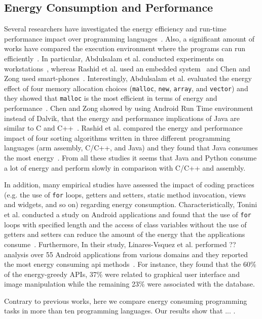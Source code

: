 \subsection{Energy Consumption and Performance}
Several researchers have investigated the energy efficiency
and run-time performance impact over
programming languages~\cite{}.
Also, a significant amount of works have compared the execution
environment where the programs can run efficiently~\cite{}.
In particular, Abdulsalam et al. conducted experiments on workstations~\cite{},
whereas Rashid et al. used an embedded system~\cite{} and
Chen and Zong used smart-phones~\cite{}.
Interestingly, Abdulsalam et al. evaluated the energy effect of four memory
allocation choices ({\tt malloc}, {\tt new}, {\tt array}, and {\tt vector})
and they showed that {\tt malloc} is the most efficient
in terms of energy and performance~\cite{}.
Chen and Zong showed by using Android Run Time
environment instead of Dalvik,
that the energy and performance implications of Java
are similar to C and C++~\cite{}.
Rashid et al. compared the energy and performance
impact of four sorting algorithms
written in three different programming languages
({\sc arm} assembly, C/C++, and Java) and
they found that Java consumes the most energy~\cite{}.
From all these studies it seems that
Java and Python consume a lot of energy and
perform slowly in comparison with C/C++ and assembly.

In addition, many empirical studies have assessed the impact
of coding practices
(e.g. the use of {\tt for} loops, getters and setters,
static method invocation, views and widgets, and so on)
regarding energy consumption.
Characteristically,
Tonini et al. conducted a study on Android applications
and found that the use of {\tt for} loops with specified length
and the access of class variables without the use of getters and setters
can reduce the amount of the energy that
the applications consume~\cite{}.
Furthermore, 
In their study, Linares-Vsquez et al. performed ?? analysis
over 55 Android applications from various domains
and they reported
the most energy consuming {\sc api} methods~\cite{}.
For instance, they found that
the 60\% of the energy-greedy APIs, 37\% were related to graphical user interface and
image manipulation while the remaining 23\% were associated with the database.

Contrary to previous works,
here we compare energy consuming programming tasks
in more than ten programming languages.
Our results show that ... . %